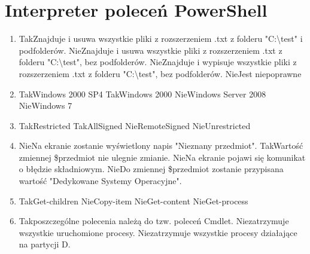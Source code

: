
\newpage
\section{Interpreter poleceń PowerShell}
	\begin{enumerate}
		\item {}%
		{Tak}{Znajduje i usuwa wszystkie pliki z rozszerzeniem .txt z folderu "C:\textbackslash test" i podfolderów.}%
		{Nie}{Znajduje i usuwa wszystkie pliki z rozszerzeniem .txt z folderu "C:\textbackslash test", bez podfolderów.}%
		{Nie}{Znajduje i wypisuje wszystkie pliki z rozszerzeniem .txt z folderu "C:\textbackslash test", bez podfolderów.}%
		{Nie}{Jest niepoprawne}
		\item {}%
		{Tak}{Windows 2000 SP4}%
		{Tak}{Windows 2000}%
		{Nie}{Windows Server 2008}%
		{Nie}{Windows 7}
		\item {}%
		{Tak}{Restricted}%
		{Tak}{AllSigned}%
		{Nie}{RemoteSigned}%
		{Nie}{Unrestricted}
		\item {}%
		{Nie}{Na ekranie zostanie wyświetlony napis "Nieznany przedmiot".}%
		{Tak}{Wartość zmiennej \$przedmiot nie ulegnie zmianie.}%
		{Nie}{Na ekranie pojawi się komunikat o błędzie składniowym.}%
		{Nie}{Do zmiennej \$przedmiot zostanie przypisana wartość "Dedykowane Systemy Operacyjne".}
		\newpage
		\item {}%
		{Tak}{Get-children}%
		{Nie}{Copy-item}%
		{Nie}{Get-content}%
		{Nie}{Get-process}
		\item {}%
		{Tak}{poszczególne polecenia należą do tzw. poleceń Cmdlet.}%
		{Nie}{zatrzymuje wszystkie uruchomione procesy.}%
		{Nie}{zatrzymuje wszystkie procesy działające na partycji D.}%

\end{enumerate}
